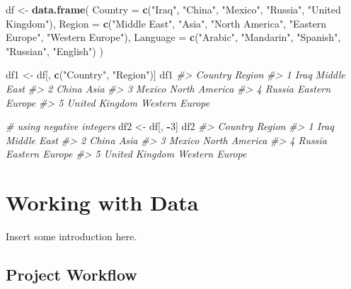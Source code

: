 \documentclass[]{book}
\newenvironment{Shaded}{\begin{snugshade}}{\end{snugshade}}
\newcommand{\KeywordTok}[1]{\textcolor[rgb]{0.13,0.29,0.53}{\textbf{#1}}}
\newcommand{\DataTypeTok}[1]{\textcolor[rgb]{0.13,0.29,0.53}{#1}}
\newcommand{\DecValTok}[1]{\textcolor[rgb]{0.00,0.00,0.81}{#1}}
\newcommand{\StringTok}[1]{\textcolor[rgb]{0.31,0.60,0.02}{#1}}
\newcommand{\CommentTok}[1]{\textcolor[rgb]{0.56,0.35,0.01}{\textit{#1}}}
\newcommand{\OperatorTok}[1]{\textcolor[rgb]{0.81,0.36,0.00}{\textbf{#1}}}
\newcommand{\NormalTok}[1]{#1}
\begin{document}
\begin{Shaded}
\begin{Highlighting}[]
\NormalTok{df <-}\StringTok{ }\KeywordTok{data.frame}\NormalTok{(}
  \DataTypeTok{Country =} \KeywordTok{c}\NormalTok{(}\StringTok{"Iraq"}\NormalTok{, }\StringTok{"China"}\NormalTok{, }\StringTok{"Mexico"}\NormalTok{, }\StringTok{"Russia"}\NormalTok{, }\StringTok{"United Kingdom"}\NormalTok{),}
  \DataTypeTok{Region =} \KeywordTok{c}\NormalTok{(}\StringTok{"Middle East"}\NormalTok{, }\StringTok{"Asia"}\NormalTok{, }\StringTok{"North America"}\NormalTok{, }\StringTok{"Eastern Europe"}\NormalTok{, }\StringTok{"Western Europe"}\NormalTok{),}
  \DataTypeTok{Language =} \KeywordTok{c}\NormalTok{(}\StringTok{"Arabic"}\NormalTok{, }\StringTok{"Mandarin"}\NormalTok{, }\StringTok{"Spanish"}\NormalTok{, }\StringTok{"Russian"}\NormalTok{, }\StringTok{"English"}\NormalTok{)}
\NormalTok{)}

\NormalTok{df1 <-}\StringTok{ }\NormalTok{df[, }\KeywordTok{c}\NormalTok{(}\StringTok{"Country"}\NormalTok{, }\StringTok{"Region"}\NormalTok{)]}
\NormalTok{df1}
\CommentTok{#>          Country         Region}
\CommentTok{#> 1           Iraq    Middle East}
\CommentTok{#> 2          China           Asia}
\CommentTok{#> 3         Mexico  North America}
\CommentTok{#> 4         Russia Eastern Europe}
\CommentTok{#> 5 United Kingdom Western Europe}

\CommentTok{# using negative integers}
\NormalTok{df2 <-}\StringTok{ }\NormalTok{df[, }\OperatorTok{-}\DecValTok{3}\NormalTok{]}
\NormalTok{df2}
\CommentTok{#>          Country         Region}
\CommentTok{#> 1           Iraq    Middle East}
\CommentTok{#> 2          China           Asia}
\CommentTok{#> 3         Mexico  North America}
\CommentTok{#> 4         Russia Eastern Europe}
\CommentTok{#> 5 United Kingdom Western Europe}
\end{Highlighting}
\end{Shaded}

\chapter{Working with Data}\label{working-with-data}

Insert some introduction here.

\section{Project Workflow}\label{project-workflow}
\end{document}

